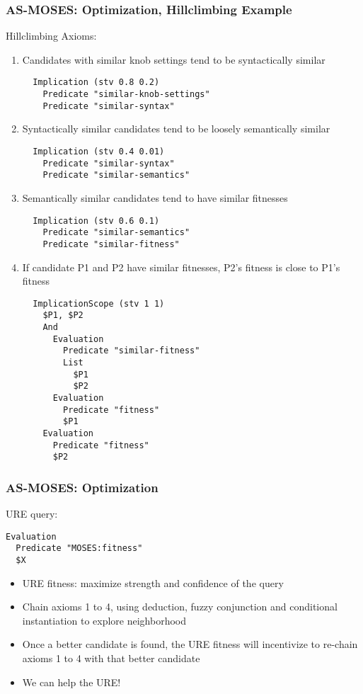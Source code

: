 \documentclass{beamer}
\begin{document}
\begin{frame}[fragile]
  \frametitle{AS-MOSES: Optimization, Hillclimbing Example}

{\tiny Hillclimbing Axioms:
\begin{enumerate}
  \item Candidates with \alert{similar knob settings} tend to be
    \alert{syntactically similar}
\begin{verbatim}
  Implication (stv 0.8 0.2)
    Predicate "similar-knob-settings"
    Predicate "similar-syntax"
\end{verbatim}
  \item \alert{Syntactically similar} candidates tend to be loosely
    \alert{semantically similar}
\begin{verbatim}
  Implication (stv 0.4 0.01)
    Predicate "similar-syntax"
    Predicate "similar-semantics"
\end{verbatim}
  \item \alert{Semantically similar} candidates tend to have
    \alert{similar fitnesses}
\begin{verbatim}
  Implication (stv 0.6 0.1)
    Predicate "similar-semantics"
    Predicate "similar-fitness"
\end{verbatim}
  \item If candidate P1 and P2 have \alert{similar fitnesses},
    \alert{P2's fitness is close to P1's fitness}
\begin{verbatim}
  ImplicationScope (stv 1 1)
    $P1, $P2
    And
      Evaluation
        Predicate "similar-fitness"
        List
          $P1
          $P2
      Evaluation
        Predicate "fitness"
        $P1
    Evaluation
      Predicate "fitness"
      $P2
\end{verbatim}
  \end{enumerate}}

\end{frame}

\begin{frame}[fragile]
  \frametitle{AS-MOSES: Optimization}
{\small
  URE query:

\begin{verbatim}
Evaluation
  Predicate "MOSES:fitness"
  $X
\end{verbatim}

\begin{itemize}
\item URE fitness: \alert{maximize strength and confidence} of the
  query
\item Chain axioms 1 to 4, using deduction, fuzzy conjunction and
  conditional instantiation to explore neighborhood
\item Once a better candidate is found, the URE fitness will
  incentivize to re-chain axioms 1 to 4 with that better candidate
\item We can help the URE!
\end{itemize}
}

\end{frame}
\end{document}
